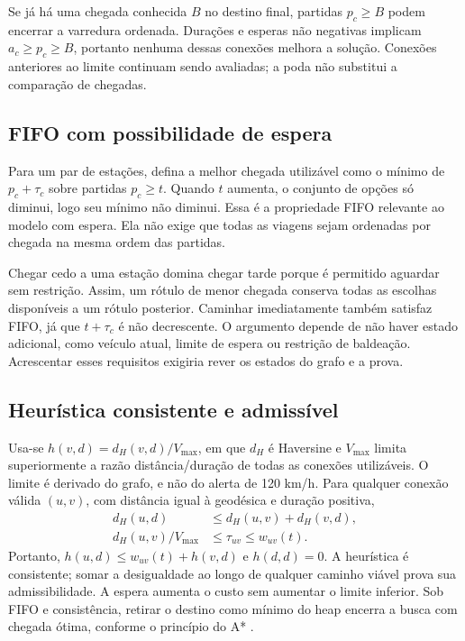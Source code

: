 \documentclass[12pt]{article}
\begin{document}
Se já há uma chegada conhecida $B$ no destino final, partidas $p_c\geq B$ podem encerrar a varredura ordenada. Durações e esperas não negativas implicam $a_c\geq p_c\geq B$, portanto nenhuma dessas conexões melhora a solução. Conexões anteriores ao limite continuam sendo avaliadas; a poda não substitui a comparação de chegadas.

\subsection{FIFO com possibilidade de espera}
Para um par de estações, defina a melhor chegada utilizável como o mínimo de $p_c+\tau_c$ sobre partidas $p_c\geq t$. Quando $t$ aumenta, o conjunto de opções só diminui, logo seu mínimo não diminui. Essa é a propriedade FIFO relevante ao modelo com espera. Ela não exige que todas as viagens sejam ordenadas por chegada na mesma ordem das partidas.

Chegar cedo a uma estação domina chegar tarde porque é permitido aguardar sem restrição. Assim, um rótulo de menor chegada conserva todas as escolhas disponíveis a um rótulo posterior. Caminhar imediatamente também satisfaz FIFO, já que $t+\tau_c$ é não decrescente. O argumento depende de não haver estado adicional, como veículo atual, limite de espera ou restrição de baldeação. Acrescentar esses requisitos exigiria rever os estados do grafo e a prova.

\subsection{Heurística consistente e admissível}
Usa-se $h(v,d)=d_H(v,d)/V_{\max}$, em que $d_H$ é Haversine e $V_{\max}$ limita superiormente a razão distância/duração de todas as conexões utilizáveis. O limite é derivado do grafo, e não do alerta de 120 km/h. Para qualquer conexão válida $(u,v)$, com distância igual à geodésica e duração positiva,
\begin{align}
d_H(u,d)&\leq d_H(u,v)+d_H(v,d),\\
d_H(u,v)/V_{\max}&\leq\tau_{uv}\leq w_{uv}(t).
\end{align}
Portanto, $h(u,d)\leq w_{uv}(t)+h(v,d)$ e $h(d,d)=0$. A heurística é consistente; somar a desigualdade ao longo de qualquer caminho viável prova sua admissibilidade. A espera aumenta o custo sem aumentar o limite inferior. Sob FIFO e consistência, retirar o destino como mínimo do heap encerra a busca com chegada ótima, conforme o princípio do A* \cite{hart}.
\end{document}
